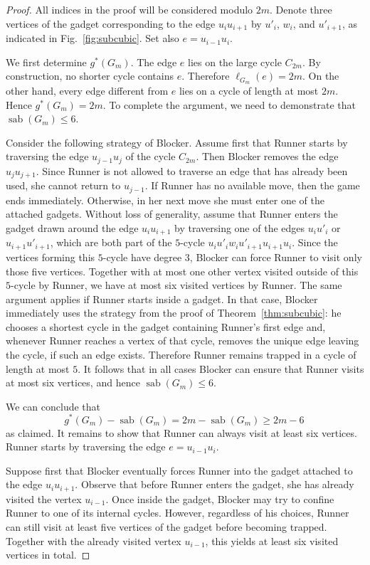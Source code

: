 \documentclass[12pt]{article}
\DeclareMathOperator{\sab}{\mathrm{sab}}
\begin{document}
\begin{proof}
All indices in the proof will be considered modulo $2m$. Denote three vertices of the gadget corresponding to the edge $u_iu_{i+1}$ by $u'_i$, $w_i$, and $u'_{i+1}$, as indicated in Fig.~\ref{fig:subcubic}. Set also $e = u_{i-1}u_i$.

We first determine $g^\ast(G_m)$. The edge $e$ lies on the large cycle $C_{2m}$. By construction, no shorter cycle contains $e$. Therefore $\ell_{G_m}(e)=2m$. On the other hand, every edge different from $e$ lies on a cycle of length at most $2m$. Hence $g^\ast(G_m)=2m$. To complete the argument, we need to demonstrate that $\sab(G_m) \le 6$.

Consider the following strategy of Blocker. Assume first that Runner starts by traversing the edge  $u_{j-1}u_{j}$ of the cycle $C_{2m}$. Then Blocker removes the edge $u_ju_{j+1}$. Since Runner is not allowed to traverse an edge that has already been used, she cannot return to $u_{j-1}$. If Runner has no available move, then the game ends immediately. Otherwise, in her next move she must enter one of the attached gadgets. Without loss of generality, assume that Runner enters the gadget drawn around the edge $u_iu_{i+1}$ by traversing one of the edges $u_i u'_i$ or $u_{i+1} u'_{i+1}$, which are both part of the $5$-cycle $u_iu'_iw_iu'_{i+1}u_{i+1}u_i$. Since the vertices forming this $5$-cycle have degree $3$, Blocker can force Runner to visit only those five vertices. Together with at most one other vertex visited outside of this $5$-cycle by Runner, we have at most six visited vertices by Runner. The same argument applies if Runner starts inside a gadget. In that case, Blocker immediately uses the strategy from the proof of Theorem~\ref{thm:subcubic}: he chooses a shortest cycle in the gadget containing Runner's first edge and, whenever Runner reaches a vertex of that cycle, removes the unique edge leaving the cycle, if such an edge exists. Therefore Runner remains trapped in a cycle of length at most $5$. It follows that in all cases Blocker can ensure that Runner visits at most six vertices, and hence $\sab(G_m)\le 6$. 

We can conclude that
$$g^\ast(G_m) - \sab(G_m) = 2m - \sab(G_m) \ge 2m -6\,$$
as claimed.
\iffalse
\medskip
It remains to show that Runner can always visit at least six vertices. Runner starts by traversing the edge $e=u_{i-1}u_i$.

Suppose first that Blocker eventually forces Runner into the gadget attached to the edge $u_iu_{i+1}$. Observe that before Runner enters the gadget, she has already visited the vertex $u_{i-1}$. Once inside the gadget, Blocker may try to confine Runner to one of its internal cycles. However, regardless of his choices, Runner can still visit at least five vertices of the gadget before becoming trapped. Together with the already visited vertex $u_{i-1}$, this yields at least six visited vertices in total.


\end{proof}
\end{document}
